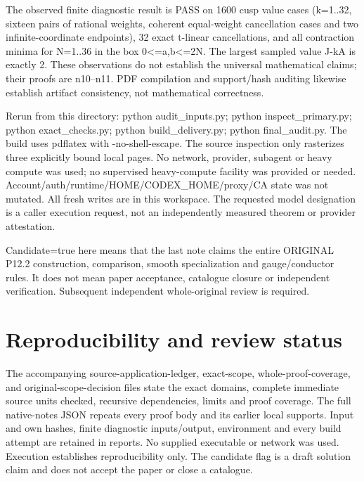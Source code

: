 \documentclass[11pt]{article}
\begin{document}
The observed finite diagnostic result is PASS on 1600 cusp value cases (k=1..32, sixteen pairs of rational weights, coherent equal-weight cancellation cases and two infinite-coordinate endpoints), 32 exact t-linear cancellations, and all contraction minima for N=1..36 in the box 0<=a,b<=2N. The largest sampled value J-kA is exactly 2. These observations do not establish the universal mathematical claims; their proofs are n10--n11. PDF compilation and support/hash auditing likewise establish artifact consistency, not mathematical correctness.

Rerun from this directory: python audit\_inputs.py; python inspect\_primary.py; python exact\_checks.py; python build\_delivery.py; python final\_audit.py. The build uses pdflatex with -no-shell-escape. The source inspection only rasterizes three explicitly bound local pages. No network, provider, subagent or heavy compute was used; no supervised heavy-compute facility was provided or needed. Account/auth/runtime/HOME/CODEX\_HOME/proxy/CA state was not mutated. All fresh writes are in this workspace. The requested model designation is a caller execution request, not an independently measured theorem or provider attestation.

Candidate=true here means that the last note claims the entire ORIGINAL P12.2 construction, comparison, smooth specialization and gauge/conductor rules. It does not mean paper acceptance, catalogue closure or independent verification. Subsequent independent whole-original review is required.

\section*{Reproducibility and review status}
The accompanying source-application-ledger, exact-scope, whole-proof-coverage,
and original-scope-decision files state the exact domains, complete immediate
source units checked, recursive dependencies, limits and proof coverage.
The full native-notes JSON repeats every proof body and its earlier local supports.
Input and own hashes, finite diagnostic inputs/output, environment and every
build attempt are retained in reports. No supplied executable or network was used.
Execution establishes reproducibility only. The candidate flag is a draft
solution claim and does not accept the paper or close a catalogue.
\end{document}

